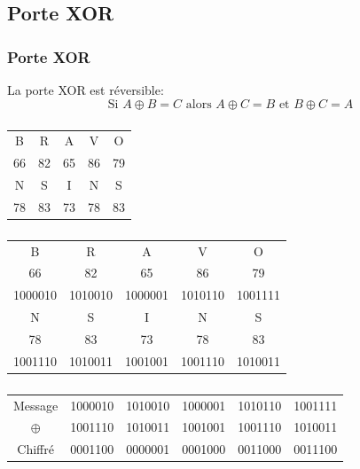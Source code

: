 \documentclass[svgnames,11pt]{beamer}
\begin{document}
\subsection{Porte XOR}
\begin{frame}
    \frametitle{Porte XOR}

    \begin{aretenir}[]
    La porte XOR est réversible:
    $$\mbox{Si }A\oplus B = C \mbox{ alors } A\oplus C=B \mbox{ et }B\oplus C=A$$
    \end{aretenir}

\end{frame}
\begin{frame}
    \frametitle{}

    \begin{center}
        \begin{tabular}{*{5}{c}}
            B&R&A&V&O\\
            66&82&65&86&79\\
            N&S&I&N&S\\
            78&83&73&78&83\\
        \end{tabular}
    \end{center}

\end{frame}
\begin{frame}
    \frametitle{}

    \begin{center}
        \begin{tabular}{*{5}{c}}
            B&R&A&V&O\\
    
            66&82&65&86&79\\
            1000010&1010010&1000001&1010110&1001111\\
            N&S&I&N&S\\
    
            78&83&73&78&83\\
            1001110&1010011&1001001&1001110&1010011\\
        \end{tabular}
    \end{center}

\end{frame}
\begin{frame}
    \frametitle{}

    \begin{center}
        \begin{tabular}{*{6}{c}}
            Message&1000010&1010010&1000001&1010110&1001111\\
            $\oplus$&1001110&1010011&1001001&1001110&1010011\\
            \hline
            Chiffré&0001100&0000001&0001000&0011000&0011100\\
        \end{tabular}
    \end{center}
\end{frame}
\end{document}
